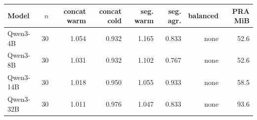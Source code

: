 \begin{tabular}{lrrrrrrr}
\toprule
Model & $n$ & concat warm & concat cold & seg. warm & seg. agr. & balanced & PRA MiB \\
\midrule
Qwen3-4B & 30 & 1.054 & 0.932 & 1.165 & 0.833 & none & 52.6 \\
Qwen3-8B & 30 & 1.031 & 0.932 & 1.102 & 0.767 & none & 52.6 \\
Qwen3-14B & 30 & 1.018 & 0.950 & 1.055 & 0.933 & none & 58.5 \\
Qwen3-32B & 30 & 1.011 & 0.976 & 1.047 & 0.833 & none & 93.6 \\
\bottomrule
\end{tabular}
